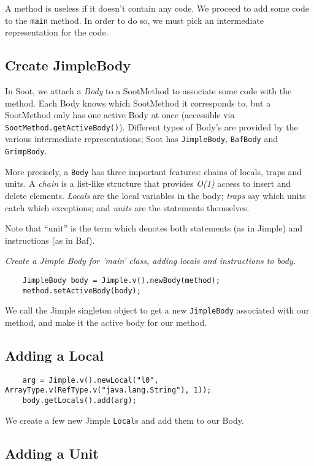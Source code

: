 \documentclass{article}
\begin{document}
A method is useless if it doesn't contain any code.  We proceed to add some
code to the {\tt main} method.  In order to do so, we must pick an intermediate
representation for the code.

\subsection{Create JimpleBody}

In Soot, we attach a {\em Body} to a SootMethod to associate some code with
the method.  Each Body knows which SootMethod it corresponds to, but a SootMethod
only has one active Body at once (accessible via {\tt SootMethod.getActiveBody()}).
Different types of Body's are provided by the various intermediate representations;
Soot has {\tt JimpleBody}, {\tt BafBody} and {\tt GrimpBody}.

More precisely, a {\tt Body} has three important features: chains of
locals, traps and units.  A {\em chain} is a list-like structure that
provides {\em O(1)} access to insert and delete elements.  {\em Locals}
are the local variables in the body; {\em traps} say which units catch
which exceptions; and {\em units} are the statements themselves.

Note that ``unit'' is the term which denotes both statements (as in Jimple)
and instructions (as in Baf).

{\em Create a Jimple Body for 'main' class, adding locals and instructions to body.}

\begin{verbatim}
    JimpleBody body = Jimple.v().newBody(method);
    method.setActiveBody(body);
\end{verbatim}

We call the Jimple singleton object to get a new {\tt JimpleBody} associated
with our method, and make it the active body for our method.

\subsection{Adding a Local}

\begin{verbatim}
    arg = Jimple.v().newLocal("l0", ArrayType.v(RefType.v("java.lang.String"), 1));
    body.getLocals().add(arg);
\end{verbatim}

We create a few new Jimple {\tt Local}s and add them to our Body.

\subsection{Adding a Unit}
\end{document}
